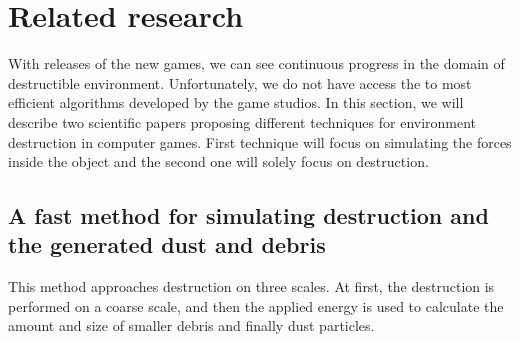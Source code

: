 \section{Related research}
With releases of the new games, we can see continuous progress in the domain of destructible environment. Unfortunately, we do not have access the to most efficient algorithms developed by the game studios. In this section, we will describe two scientific papers proposing different techniques for environment destruction in computer games. First technique will focus on simulating the forces inside the object and the second one will solely focus on destruction.

\subsection{A fast method for simulating destruction and the generated dust
and debris}
\label{sec:edem}
This method \cite{edem} approaches destruction on three scales. At first, the destruction is performed on a coarse scale, and then the applied energy is used to calculate the amount and size of smaller debris and finally dust particles.

